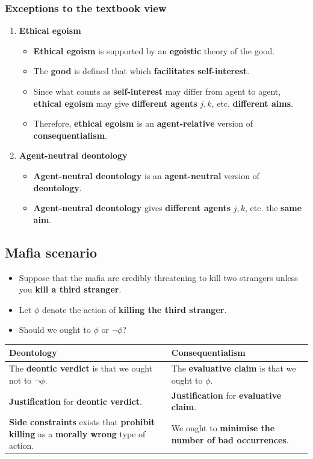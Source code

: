 \documentclass[11pt]{article}
\begin{document}
 \newpage
\subsubsection{Exceptions to the textbook view}
\label{sec:orgb08ee7a}
\begin{enumerate}
\item \textbf{Ethical egoism}
\begin{itemize}
\item \textbf{Ethical egoism} is supported by an \textbf{egoistic} theory of the good.
\item The \textbf{good} is defined that which \textbf{facilitates self-interest}.
\item Since what counts as \textbf{self-interest} may differ from agent to agent, \textbf{ethical egoism} may give \textbf{different agents} \(j, k\), etc. \textbf{different aims}.
\item Therefore, \textbf{ethical egoism} is an \textbf{agent-relative} version of \textbf{consequentialism}.
\end{itemize}
\item \textbf{Agent-neutral deontology}
\begin{itemize}
\item \textbf{Agent-neutral deontology} is an \textbf{agent-neutral} version of \textbf{deontology}.
\item \textbf{Agent-neutral deontology} gives \textbf{different agents} \(j, k\), etc. the \textbf{same aim}.
\end{itemize}
\end{enumerate}
\subsection{Mafia scenario}
\label{sec:orgfa43828}
\begin{itemize}
\item Suppose that the mafia are credibly threatening to kill two strangers unless you \textbf{kill a third stranger}.
\item Let \(\phi\) denote the action of \textbf{killing the third stranger}.
\item Should we ought to \(\phi\) or \(\neg \phi\)?
\end{itemize}

\begin{center}
\begin{tabularx}{\textwidth}{|X|X|}
\hline
Deontology & Consequentialism\\
\hline
The \textbf{deontic verdict} is that we ought not to \(\neg \phi\). & The \textbf{evaluative claim} is that we ought to \(\phi\).\\
\hline
\textbf{Justification} for \textbf{deontic verdict}. & \textbf{Justification} for \textbf{evaluative claim}.\\
\textbf{Side constraints} exists that \textbf{prohibit killing} as a \textbf{morally wrong} type of action. & We ought to \textbf{minimise the number of bad occurrences}.\\
\hline
\end{tabularx}
\end{center}
\end{document}
